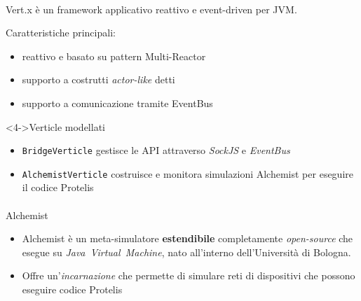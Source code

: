     \begin{frame}{\insertsectionhead}
      \framesubtitle{\insertsubsectionhead}

      \begin{block}{Vert.x}
         è un framework applicativo reattivo e event-driven per JVM.

        Caratteristiche principali:
        \begin{itemize}
          \item<1-> reattivo e basato su pattern Multi-Reactor
          \item<2-> supporto a costrutti \emph{actor-like} detti 
          \item<3-> supporto a comunicazione tramite EventBus
        \end{itemize}

      \end{block}


      \begin{block}<4->{Verticle modellati}
        \begin{itemize}
          \item \texttt{BridgeVerticle} gestisce le API attraverso \emph{SockJS} e \emph{EventBus}
          \item \texttt{AlchemistVerticle} costruisce e monitora simulazioni Alchemist per eseguire il codice Protelis
        \end{itemize}
      \end{block}
    \end{frame}

    \begin{frame}{\insertsectionhead}
      \framesubtitle{\insertsubsectionhead}

      \begin{block}{Alchemist}
        \begin{itemize}
          \item<1-> Alchemist è un meta-simulatore \textbf<2->{estendibile} completamente \emph{open-source} che esegue su \emph{Java~Virtual~Machine}, nato all'interno dell'Università di Bologna.
          \item<2-> Offre un'\emph{incarnazione} che permette di simulare reti di dispositivi che possono eseguire codice Protelis
        \end{itemize}
      \end{block}
    \end{frame}

